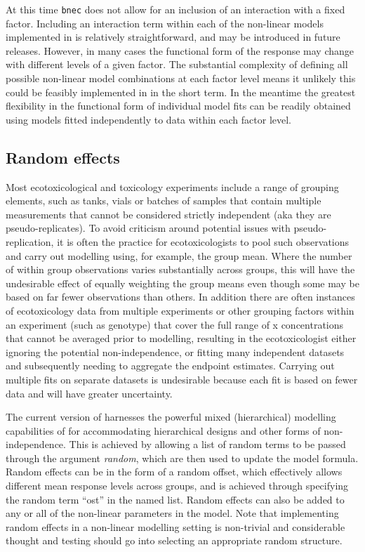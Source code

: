 \documentclass[
]{jss}
\begin{document}
At this time \texttt{bnec} does not allow for an inclusion of an
interaction with a fixed factor. Including an interaction term within
each of the non-linear models implemented in  is
relatively straightforward, and may be introduced in future releases.
However, in many cases the functional form of the response may change
with different levels of a given factor. The substantial complexity of
defining all possible non-linear model combinations at each factor level
means it unlikely this could be feasibly implemented in 
in the short term. In the meantime the greatest flexibility in the
functional form of individual model fits can be readily obtained using
models fitted independently to data within each factor level.

\hypertarget{random-effects}{%
\subsection{Random effects}\label{random-effects}}

Most ecotoxicological and toxicology experiments include a range of
grouping elements, such as tanks, vials or batches of samples that
contain multiple measurements that cannot be considered strictly
independent (aka they are pseudo-replicates). To avoid criticism around
potential issues with pseudo-replication, it is often the practice for
ecotoxicologists to pool such observations and carry out modelling
using, for example, the group mean. Where the number of within group
observations varies substantially across groups, this will have the
undesirable effect of equally weighting the group means even though some
may be based on far fewer observations than others. In addition there
are often instances of ecotoxicology data from multiple experiments or
other grouping factors within an experiment (such as genotype) that
cover the full range of x concentrations that cannot be averaged prior
to modelling, resulting in the ecotoxicologist either ignoring the
potential non-independence, or fitting many independent datasets and
subsequently needing to aggregate the endpoint estimates. Carrying out
multiple fits on separate datasets is undesirable because each fit is
based on fewer data and will have greater uncertainty.

The current version of  harnesses the powerful mixed
(hierarchical) modelling capabilities of  for accommodating
hierarchical designs and other forms of non-independence. This is
achieved by allowing a list of random terms to be passed through the
argument \emph{random}, which are then used to update the 
model formula. Random effects can be in the form of a random offset,
which effectively allows different mean response levels across groups,
and is achieved through specifying the random term ``ost'' in the named
list. Random effects can also be added to any or all of the non-linear
parameters in the model. Note that implementing random effects in a
non-linear modelling setting is non-trivial and considerable thought and
testing should go into selecting an appropriate random structure.
\end{document}
